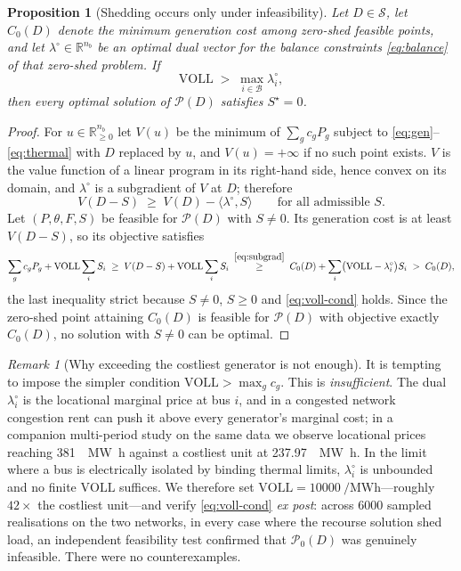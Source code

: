 \documentclass[11pt,a4paper]{article}
\theoremstyle{definition}
\theoremstyle{plain}
\newtheorem{proposition}[definition]{Proposition}
\theoremstyle{remark}
\newtheorem{remark}[definition]{Remark}
\newcommand{\R}{\mathbb{R}}
\newcommand{\VOLL}{\mathrm{VOLL}}
\begin{document}
\begin{proposition}[Shedding occurs only under infeasibility]\label{prop:voll}
Let $D \in \mathcal{S}$, let $C_0(D)$ denote the minimum generation cost among
zero-shed feasible points, and let $\lambda^\circ \in \R^{n_b}$ be an optimal dual
vector for the balance constraints \eqref{eq:balance} of that zero-shed problem.
If
\begin{equation}\label{eq:voll-cond}
\VOLL \;>\; \max_{i\in\mathcal{B}} \lambda^\circ_i ,
\end{equation}
then every optimal solution of $\mathcal{P}(D)$ satisfies $S^\star = 0$.
\end{proposition}

\begin{proof}
For $u \in \R^{n_b}_{\ge 0}$ let $V(u)$ be the minimum of $\sum_g c_g P_g$ subject
to \eqref{eq:gen}--\eqref{eq:thermal} with $D$ replaced by $u$, and $V(u) = +\infty$
if no such point exists. $V$ is the value function of a linear program in its
right-hand side, hence convex on its domain, and $\lambda^\circ$ is a subgradient
of $V$ at $D$; therefore
\begin{equation}\label{eq:subgrad}
V(D - S) \;\ge\; V(D) - \langle \lambda^\circ, S\rangle
\qquad\text{for all admissible } S .
\end{equation}
Let $(P,\theta,F,S)$ be feasible for $\mathcal{P}(D)$ with $S \ne 0$. Its
generation cost is at least $V(D-S)$, so its objective satisfies
\[
\sum_g c_g P_g + \VOLL \sum_i S_i
\;\ge\; V(D-S) + \VOLL \sum_i S_i
\;\overset{\eqref{eq:subgrad}}{\ge}\;
C_0(D) + \sum_i \bigl(\VOLL - \lambda^\circ_i\bigr) S_i
\;>\; C_0(D),
\]
the last inequality strict because $S \ne 0$, $S \ge 0$ and
\eqref{eq:voll-cond} holds. Since the zero-shed point attaining $C_0(D)$ is
feasible for $\mathcal{P}(D)$ with objective exactly $C_0(D)$, no solution with
$S \ne 0$ can be optimal.
\end{proof}

\begin{remark}[Why exceeding the costliest generator is not enough]\label{rem:voll}
It is tempting to impose the simpler condition $\VOLL > \max_g c_g$. This is
\emph{insufficient}. The dual $\lambda^\circ_i$ is the locational marginal price
at bus $i$, and in a congested network congestion rent can push it above every
generator's marginal cost; in a companion multi-period study on the same data we
observe locational prices reaching \SI{381}{\per\mega\watt\hour} against a
costliest unit at \SI{237.97}{\per\mega\watt\hour}. In the limit where a bus is
electrically isolated by binding thermal limits, $\lambda^\circ_i$ is unbounded
and no finite $\VOLL$ suffices. We therefore set
$\VOLL = \SI{10000}{\per\mega\watt\hour}$---roughly $42\times$ the costliest
unit---and verify \eqref{eq:voll-cond} \emph{ex post}: across \num{6000} sampled
realisations on the two networks, in every case where the recourse solution shed
load, an independent feasibility test confirmed that $\mathcal{P}_0(D)$ was
genuinely infeasible. There were no counterexamples.
\end{remark}
\end{document}
